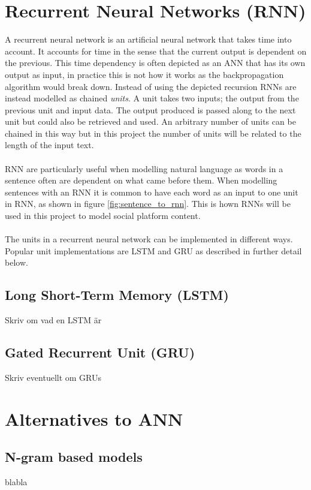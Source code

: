 \section{Recurrent Neural Networks (RNN)}
A recurrent neural network is an artificial neural network that takes time into account. It accounts for time in the sense that the current output is dependent on the previous. This time dependency is often depicted as an ANN that has its own output as input, in practice this is not how it works as the backpropagation algorithm would break down. Instead of using the depicted recursion RNNs are instead modelled as chained \textit{units}. A unit takes two inputs; the output from the previous unit and input data. The output produced is passed along to the next unit but could also be retrieved and used. An arbitrary number of units can be chained in this way but in this project the number of units will be related to the length of the input text. 
\\\\
RNN are particularly useful when modelling natural language as words in a sentence often are dependent on what came before them. When modelling sentences with an RNN it is common to have each word as an input to one unit in RNN, as shown in figure \ref{fig:sentence_to_rnn}. This is hown RNNs will be used in this project to model social platform content.
\\\\
The units in a recurrent neural network can be implemented in different ways. Popular unit implementations are LSTM and GRU as described in further detail below. 

\subsection{Long Short-Term Memory (LSTM)}
Skriv om vad en LSTM är \parencite{LSTMdefined}

\subsection{Gated Recurrent Unit (GRU)}
Skriv eventuellt om GRUs

\section{Alternatives to ANN}
\subsection{N-gram based models}
blabla
